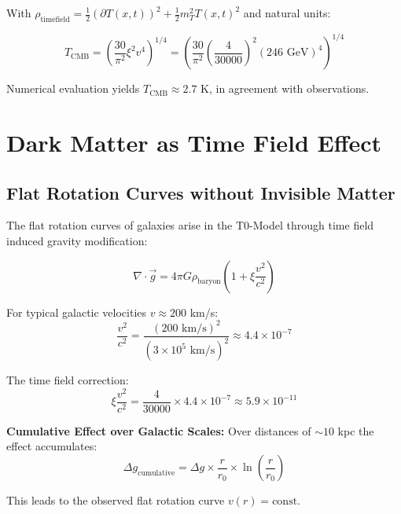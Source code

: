 \documentclass[12pt,a4paper]{report}
\newcommand{\Tfield}{T(x,t)}  %
\newcommand{\xipar}{\xi}      %
\begin{document}
	With $\rho_{\text{timefield}} = \frac{1}{2} (\partial \Tfield)^2 + \frac{1}{2} m_T^2 \Tfield^2$ and natural units:
	
	\begin{equation}
		T_{\text{CMB}} = \left(\frac{30}{\pi^2} \xipar^2 v^4\right)^{1/4} = \left(\frac{30}{\pi^2} \left(\frac{4}{30000}\right)^2 (246 \text{ GeV})^4\right)^{1/4}
	\end{equation}
	
	Numerical evaluation yields $T_{\text{CMB}} \approx 2.7$ K, in agreement with observations.
	
	\section{Dark Matter as Time Field Effect}\label{sec:dark_matter}
	
	\subsection{Flat Rotation Curves without Invisible Matter}\label{subsec:flat_rotation_curves}
	
	The flat rotation curves of galaxies arise in the T0-Model through time field induced gravity modification:
	
	\begin{equation}\label{eq:modified_gravitation}
		\nabla \cdot \vec{g} = 4\pi G \rho_{\text{baryon}} \left(1 + \xipar \frac{v^2}{c^2}\right)
	\end{equation}
	
	For typical galactic velocities $v \approx 200$ km/s:
	\begin{equation}
		\frac{v^2}{c^2} = \frac{(200 \text{ km/s})^2}{(3 \times 10^5 \text{ km/s})^2} \approx 4.4 \times 10^{-7}
	\end{equation}
	
	The time field correction:
	\begin{equation}
		\xipar \frac{v^2}{c^2} = \frac{4}{30000} \times 4.4 \times 10^{-7} \approx 5.9 \times 10^{-11}
	\end{equation}
	
	\textbf{Cumulative Effect over Galactic Scales:}
	Over distances of $\sim 10$ kpc the effect accumulates:
	\begin{equation}
		\Delta g_{\text{cumulative}} = \Delta g \times \frac{r}{r_0} \times \ln\left(\frac{r}{r_0}\right)
	\end{equation}
	
	This leads to the observed flat rotation curve $v(r) = \text{const}$.
	
\end{document}
